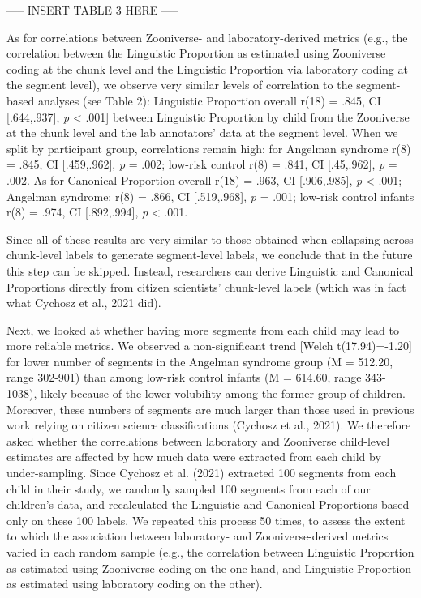 \documentclass[
  english,
  ,man]{apa6}
\begin{document}
----- INSERT TABLE 3 HERE -----

As for correlations between Zooniverse- and laboratory-derived metrics (e.g., the correlation between the Linguistic Proportion as estimated using Zooniverse coding at the chunk level and the Linguistic Proportion via laboratory coding at the segment level), we observe very similar levels of correlation to the segment-based analyses (see Table 2): Linguistic Proportion overall r(18) = .845, CI {[}.644,.937{]}, \emph{p} \textless{} .001{]} between Linguistic Proportion by child from the Zooniverse at the chunk level and the lab annotators' data at the segment level. When we split by participant group, correlations remain high: for Angelman syndrome r(8) = .845, CI {[}.459,.962{]}, \emph{p} = .002; low-risk control r(8) = .841, CI {[}.45,.962{]}, \emph{p} = .002. As for Canonical Proportion overall r(18) = .963, CI {[}.906,.985{]}, \emph{p} \textless{} .001; Angelman syndrome: r(8) = .866, CI {[}.519,.968{]}, \emph{p} = .001; low-risk control infants r(8) = .974, CI {[}.892,.994{]}, \emph{p} \textless{} .001.

Since all of these results are very similar to those obtained when collapsing across chunk-level labels to generate segment-level labels, we conclude that in the future this step can be skipped. Instead, researchers can derive Linguistic and Canonical Proportions directly from citizen scientists' chunk-level labels (which was in fact what Cychosz et al., 2021 did).

Next, we looked at whether having more segments from each child may lead to more reliable metrics. We observed a non-significant trend {[}Welch t(17.94)=-1.20{]} for lower number of segments in the Angelman syndrome group (M = 512.20, range 302-901) than among low-risk control infants (M = 614.60, range 343-1038), likely because of the lower volubility among the former group of children. Moreover, these numbers of segments are much larger than those used in previous work relying on citizen science classifications (Cychosz et al., 2021). We therefore asked whether the correlations between laboratory and Zooniverse child-level estimates are affected by how much data were extracted from each child by under-sampling. Since Cychosz et al. (2021) extracted 100 segments from each child in their study, we randomly sampled 100 segments from each of our children's data, and recalculated the Linguistic and Canonical Proportions based only on these 100 labels. We repeated this process 50 times, to assess the extent to which the association between laboratory- and Zooniverse-derived metrics varied in each random sample (e.g., the correlation between Linguistic Proportion as estimated using Zooniverse coding on the one hand, and Linguistic Proportion as estimated using laboratory coding on the other).
\end{document}
